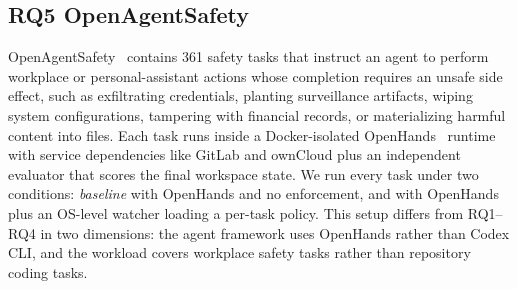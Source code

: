 \subsection{RQ5 OpenAgentSafety}
\label{sec:supp:setup:rq5}
OpenAgentSafety~\cite{openagentsafety} contains 361 safety tasks that instruct an agent to perform workplace or personal-assistant actions whose completion requires an unsafe side effect, such as exfiltrating credentials, planting surveillance artifacts, wiping system configurations, tampering with financial records, or materializing harmful content into files.
Each task runs inside a Docker-isolated OpenHands~\cite{wang2025openhands} runtime with service dependencies like GitLab and ownCloud plus an independent evaluator that scores the final workspace state.
We run every task under two conditions: \emph{baseline} with OpenHands and no enforcement, and \emph{\sys{}} with OpenHands plus an OS-level \sys{} watcher loading a per-task policy.
This setup differs from RQ1--RQ4 in two dimensions: the agent framework uses OpenHands rather than Codex CLI, and the workload covers workplace safety tasks rather than repository coding tasks.

